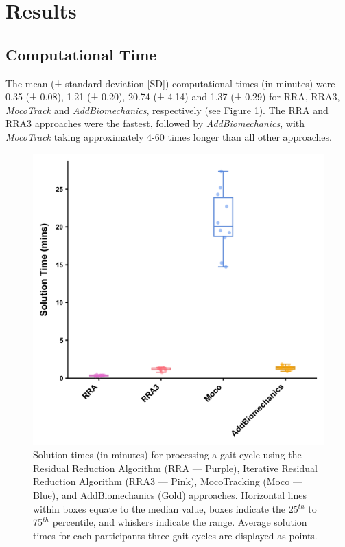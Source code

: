\documentclass[]{elsarticle} %
\begin{document}
\hypertarget{results}{%
\section{Results}\label{results}}

\hypertarget{computational-time}{%
\subsection{Computational Time}\label{computational-time}}

The mean (± standard deviation {[}SD{]}) computational times (in
minutes) were 0.35 (± 0.08), 1.21 (± 0.20), 20.74 (± 4.14) and 1.37 (±
0.29) for RRA, RRA3, \emph{MocoTrack} and \emph{AddBiomechanics},
respectively (see Figure \ref{fig:computationalTimes}). The RRA and RRA3
approaches were the fastest, followed by \emph{AddBiomechanics}, with
\emph{MocoTrack} taking approximately 4-60 times longer than all other
approaches.

\begin{figure}

{\centering \includegraphics[width=0.75\linewidth]{../results/HamnerDelpDataset/figures/averageSolutionTimes} 

}

\caption{Solution times (in minutes) for processing a gait cycle using the Residual Reduction Algorithm (RRA — Purple), Iterative Residual Reduction Algorithm  (RRA3 — Pink), MocoTracking (Moco — Blue), and AddBiomechanics (Gold) approaches. Horizontal lines within boxes equate to the median value, boxes indicate the 25$^{th}$ to 75$^{th}$ percentile, and whiskers indicate the range. Average solution times for each participants three gait cycles are displayed as points.}\label{fig:computationalTimes}
\end{figure}
\end{document}

